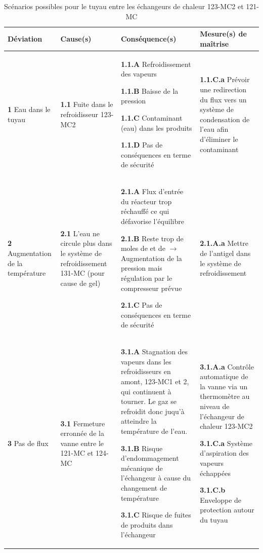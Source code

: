 \begin{table}
\centering
\footnotesize{
\begin{tabular}{|p{}|p{}|p{}|p{}|}
\hline
\textbf{Déviation} & \textbf{Cause(s)} & \textbf{Conséquence(s)} & \textbf{Mesure(s) de maîtrise} \\ \hline \hline
\textbf{1} Eau	dans le tuyau & \textbf{1.1} Fuite dans le refroidisseur 123-MC2 & \textbf{1.1.A}	Refroidissement des vapeurs

\textbf{1.1.B}	Baisse	de la pression

\textbf{1.1.C}	Contaminant	(eau)	dans	les	
produits

\textbf{1.1.D}	 Pas de conséquences en terme de sécurité &
\textbf{1.1.C.a} Prévoir une redirection du flux vers un système de condensation de l’eau afin d’éliminer le contaminant	\\ \hline

\textbf{2} Augmentation de la température & \textbf{2.1} L’eau ne circule plus dans le système de refroidissement 131-MC (pour	cause	de gel) &
\textbf{2.1.A}	Flux d’entrée du réacteur trop réchauffé ce qui défavorise l’équilibre

\textbf{2.1.B}	Reste	trop de moles de \ce{N2} et de \ce{H2} $\rightarrow$ Augmentation de la pression mais régulation par le compresseur prévue

\textbf{2.1.C}	Pas de conséquences en terme de sécurité	
&
\textbf{2.1.A.a} Mettre de l’antigel dans le système de refroidissement \\ \hline
\textbf{3} Pas	de flux & \textbf{3.1} Fermeture erronnée de la vanne entre le 121-MC et 124-MC &
\textbf{3.1.A}	Stagnation des vapeurs dans les refroidisseurs en amont, 123-MC1 et 2, qui continuent à tourner.	
Le gaz se refroidit donc juqu’à atteindre la température de l’eau.

\textbf{3.1.B}	Risque d’endommagement mécanique de l’échangeur à cause du changement de température

\textbf{3.1.C}	Risque de fuites de produits dans l’échangeur &
\textbf{3.1.A.a} Contrôle automatique de la vanne via un thermomètre au niveau de l’échangeur de chaleur 123-MC2

\textbf{3.1.C.a} Système d’aspiration des vapeurs échappées

\textbf{3.1.C.b} Enveloppe de protection autour du tuyau\\ \hline

\end{tabular}
}
\caption{Scénarios possibles pour le tuyau entre les échangeurs de chaleur 123-MC2 et 121-MC}
\label{scenarii}
\end{table}


